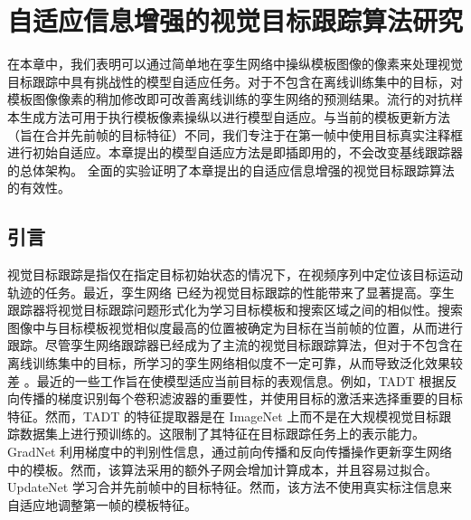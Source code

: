 \chapter{自适应信息增强的视觉目标跟踪算法研究}\label{chap:MTP}
在本章中，我们表明可以通过简单地在孪生网络中操纵模板图像的像素来处理视觉目标跟踪中具有挑战性的模型自适应任务。对于不包含在离线训练集中的目标，对模板图像像素的稍加修改即可改善离线训练的孪生网络的预测结果。流行的对抗样本生成方法可用于执行模板像素操纵以进行模型自适应。与当前的模板更新方法（旨在合并先前帧的目标特征）不同，我们专注于在第一帧中使用目标真实注释框进行初始自适应。本章提出的模型自适应方法是即插即用的，不会改变基线跟踪器的总体架构。
全面的实验证明了本章提出的自适应信息增强的视觉目标跟踪算法的有效性。

\section{引言}
视觉目标跟踪是指仅在指定目标初始状态的情况下，在视频序列中定位该目标运动轨迹的任务。最近，孪生网络 \cite{danelljan2019atom, SiamFC} 已经为视觉目标跟踪的性能带来了显著提高。孪生跟踪器将视觉目标跟踪问题形式化为学习目标模板和搜索区域之间的相似性。搜索图像中与目标模板视觉相似度最高的位置被确定为目标在当前帧的位置，从而进行跟踪。尽管孪生网络跟踪器已经成为了主流的视觉目标跟踪算法，但对于不包含在离线训练集中的目标，所学习的孪生网络相似度不一定可靠，从而导致泛化效果较差 \cite{Bhat_2019_ICCV}。最近的一些工作旨在使模型适应当前目标的表观信息。例如，TADT \cite{Li_2019_CVPR} 根据反向传播的梯度识别每个卷积滤波器的重要性，并使用目标的激活来选择重要的目标特征。然而，TADT 的特征提取器是在 ImageNet \cite{VID} 上而不是在大规模视觉目标跟踪数据集上进行预训练的。这限制了其特征在目标跟踪任务上的表示能力。GradNet \cite{Li_2019_ICCV} 利用梯度中的判别性信息，通过前向传播和反向传播操作更新孪生网络中的模板。然而，该算法采用的额外子网会增加计算成本，并且容易过拟合。UpdateNet \cite{Zhang_2019_ICCV} 学习合并先前帧中的目标特征。然而，该方法不使用真实标注信息来自适应地调整第一帧的模板特征。

